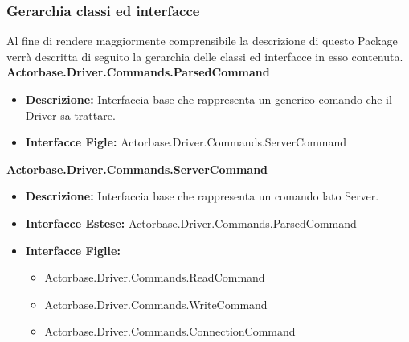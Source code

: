 \documentclass[a4paper]{article}
\begin{document}
		\subsubsection{Gerarchia classi ed interfacce}
		Al fine di rendere maggiormente comprensibile la descrizione di questo Package verrà descritta di seguito la gerarchia delle classi ed interfacce in esso contenuta.\\
		\textbf{Actorbase.Driver.Commands.ParsedCommand}
			\begin{itemize}
				\item \textbf{Descrizione:} Interfaccia base che rappresenta un generico comando che il Driver sa trattare.
				\item \textbf{Interfacce Figle:} Actorbase.Driver.Commands.ServerCommand
			\end{itemize}

		
		\textbf{Actorbase.Driver.Commands.ServerCommand}
			\begin{itemize}
				\item \textbf{Descrizione:} Interfaccia base che rappresenta un comando lato Server.
				\item \textbf{Interfacce Estese:} Actorbase.Driver.Commands.ParsedCommand
				\item \textbf{Interfacce Figlie:}
					\begin{itemize}
						\item Actorbase.Driver.Commands.ReadCommand
						\item Actorbase.Driver.Commands.WriteCommand
						\item Actorbase.Driver.Commands.ConnectionCommand
					\end{itemize}
			\end{itemize}
		
\end{document}
